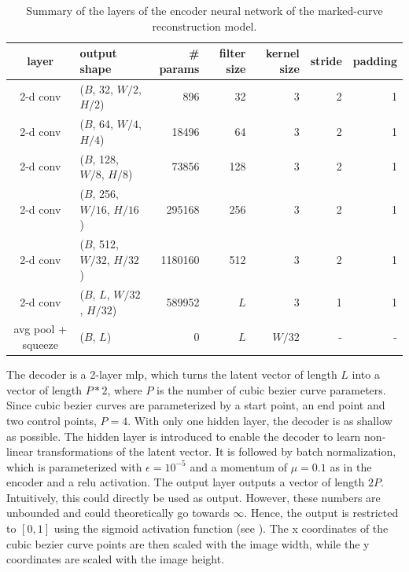 \begin{table}[h]
    \centering
    \begin{tabular}{c|l|r|r|r|r|r}
         layer & output shape & \# params & filter size & kernel size & stride & padding \\
         \hline
         2-d conv & ($B$, 32, $W/2$, $H/2$) & 896 & 32 & 3 & 2 & 1 \\
         2-d conv & ($B$, 64, $W/4$, $H/4$) & 18496 & 64 & 3 & 2 & 1 \\
         2-d conv & ($B$, 128, $W/8$, $H/8$) & 73856 & 128 & 3 & 2 & 1 \\
         2-d conv & ($B$, 256, $W/16$, $H/16$) & 295168 & 256 & 3 & 2 & 1 \\
         2-d conv & ($B$, 512, $W/32$, $H/32$) & 1180160 & 512 & 3 & 2 & 1 \\
         2-d conv & ($B$, $L$, $W/32$, $H/32$) & 589952 & $L$ & 3 & 1 & 1 \\
         avg pool + squeeze & ($B$, $L$) & 0 & $L$ & $W/32$ & - & - \\
    \end{tabular}
    \caption{Summary of the layers of the encoder neural network of the marked-curve reconstruction model.}
    \label{tab:encoder.summary}
\end{table}

The decoder is a 2-layer \gls{mlp}, which turns the latent vector of length $L$ into a vector of length $P*2$, where $P$ is the number of cubic bezier curve parameters. Since cubic bezier curves are parameterized by a start point, an end point and two control points, $P=4$. With only one hidden layer, the decoder is as shallow as possible. The hidden layer is introduced to enable the decoder to learn non-linear transformations of the latent vector. It is followed by batch normalization, which is parameterized with $\epsilon=10^{-5}$ and a momentum of $\mu=0.1$ as in the encoder and a \gls{relu} activation. The output layer outputs a vector of length $2P$. Intuitively, this could directly be used as output. However, these numbers are unbounded and could theoretically go towards $\infty$. Hence, the output is restricted to $[0,1]$ using the sigmoid activation function (see ). The x coordinates of the cubic bezier curve points are then scaled with the image width, while the y coordinates are scaled with the image height.

